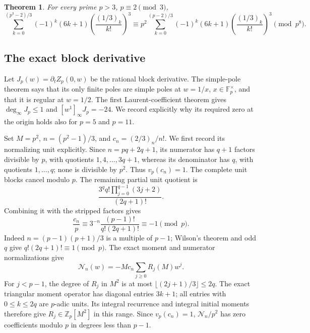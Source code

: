 \documentclass[11pt,letterpaper]{article}
\newtheorem{theorem}{Theorem}[section]
\numberwithin{equation}{section}
\begin{document}
\begin{theorem}\label{VIII-thm:e8-r3-closed}
For every prime \(p>3\), \(p\equiv2\pmod3\),
\[
 \boxed{\displaystyle
 \sum_{k=0}^{(p^3-2)/3}(-1)^k(6k+1)
       \left(\frac{(1/3)_k}{k!}\right)^3
 \equiv
 p^2\sum_{k=0}^{(p-2)/3}(-1)^k(6k+1)
       \left(\frac{(1/3)_k}{k!}\right)^3
 \pmod{p^8}.}
\]
\end{theorem}

\subsection{The exact block derivative}
Let \(J_p(w)=\partial_tZ_p(0,w)\) be the rational block derivative.
The simple-pole theorem says that its only finite poles are simple
poles at \(w=1/x\), \(x\in\mathbb F_p^\times\), and that it is regular
at \(w=1/2\).  The first Laurent-coefficient theorem gives
\(\deg_\infty J_p\le1\) and \([w^1]_\infty J_p=-24\).
We record explicitly why its required zero at the origin holds also
for \(p=5\) and \(p=11\).

Set \(M=p^2\), \(n=(p^2-1)/3\), and \(c_n=(2/3)_n/n!\).
We first record its normalizing unit explicitly.  Since
\(n=pq+2q+1\), its numerator has \(q+1\) factors divisible by \(p\),
with quotients \(1,4,\ldots,3q+1\), whereas its denominator has
\(q\), with quotients \(1,\ldots,q\); none is divisible by \(p^2\).
Thus \(v_p(c_n)=1\).  The complete unit blocks cancel modulo \(p\).
The remaining partial unit quotient is
\[
 \frac{3^q q!\prod_{j=0}^{q-1}(3j+2)}{(2q+1)!}.
 \]
Combining it with the stripped factors gives
\[
 \frac{c_n}{p}
 \equiv 3^{-n}\frac{(p-1)!}{q!(2q+1)!}
 \equiv-1\pmod p.
\]
Indeed \(n=(p-1)(p+1)/3\) is a multiple of \(p-1\);
Wilson's theorem and odd \(q\) give \(q!(2q+1)!\equiv1\pmod p\).
The exact moment and numerator normalizations give
\[
 \mathcal N_n(w)=-M c_n\sum_{j\ge0}R_j(M)w^j.
\]
For \(j<p-1\), the degree of \(R_j\) in \(M^2\) is at most
\(\lfloor(2j+1)/3\rfloor\le2q\).  The exact triangular moment
operator has diagonal entries \(3k+1\); all entries with
\(0\le k\le2q\) are \(p\)-adic units.  Its integral recurrence and
integral initial moments therefore give \(R_j\in\mathbb Z_p[M^2]\)
in this range.  Since \(v_p(c_n)=1\),
\(\mathcal N_n/p^2\) has zero coefficients modulo \(p\) in degrees
less than \(p-1\).
\end{document}
